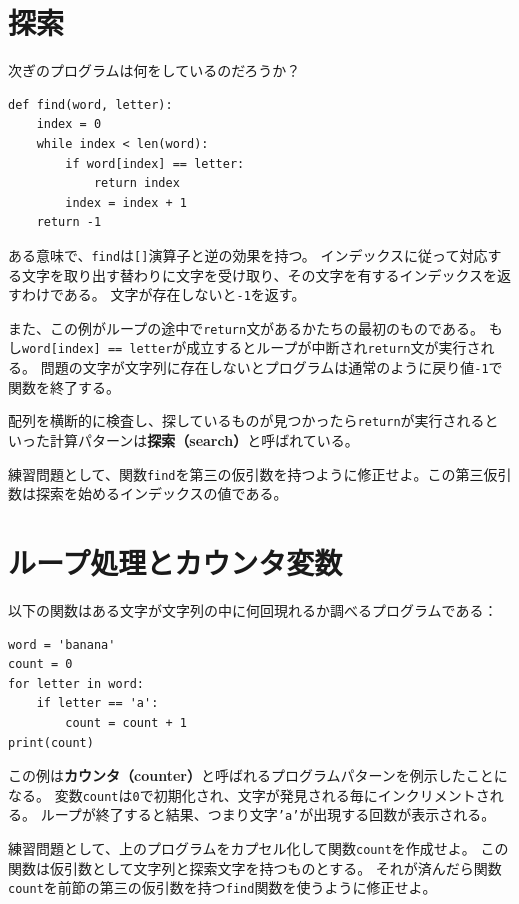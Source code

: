 \documentclass[a4j,12pt,makeidx]{jbook}
\begin{document}
\section{探索}
次ぎのプログラムは何をしているのだろうか？
\begin{verbatim}
def find(word, letter):
    index = 0
    while index < len(word):
        if word[index] == letter:
            return index
        index = index + 1
    return -1
\end{verbatim}
ある意味で、{\tt find}は{\tt []}演算子と逆の効果を持つ。
インデックスに従って対応する文字を取り出す替わりに文字を受け取り、その文字を有するインデックスを返すわけである。
文字が存在しないと{\tt -1}を返す。\par
また、この例がループの途中で{\tt return}文があるかたちの最初のものである。
もし{\tt word[index] == letter}が成立するとループが中断され{\tt return}文が実行される。
問題の文字が文字列に存在しないとプログラムは通常のように戻り値{\tt -1}で関数を終了する。 \par
配列を横断的に検査し、探しているものが見つかったら{\tt return}が実行されるといった計算パターンは{\bf 探索（search）}と呼ばれている。\par
練習問題として、関数{\tt find}を第三の仮引数を持つように修正せよ。この第三仮引数は探索を始めるインデックスの値である。
%
\section{ループ処理とカウンタ変数}
以下の関数はある文字が文字列の中に何回現れるか調べるプログラムである：
\begin{verbatim}
word = 'banana'
count = 0
for letter in word:
    if letter == 'a':
        count = count + 1
print(count)
\end{verbatim}
この例は{\bf カウンタ（counter）}と呼ばれるプログラムパターンを例示したことになる。
変数{\tt count}は{\tt 0}で初期化され、文字が発見される毎にインクリメントされる。
ループが終了すると結果、つまり文字{\tt 'a'}が出現する回数が表示される。 \par
練習問題として、上のプログラムをカプセル化して関数{\tt count}を作成せよ。
この関数は仮引数として文字列と探索文字を持つものとする。
それが済んだら関数{\tt count}を前節の第三の仮引数を持つ{\tt find}関数を使うように修正せよ。
%
\end{document}
